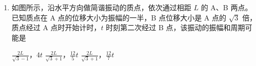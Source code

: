 \documentclass[\gkver]{gaokaozhenti}
\begin{document}
\begin{enumerate}
{体积增加了原来的 $\frac{1}{3}$，C 错误；

D．等容过程中气体做功为零，由热力学第一定律

$\Delta U = W + Q = 400 \UJ$

两个过程的初末温度相同即内能变化相同，因此内能增加都为 $400 \UJ$，D 正确；

AB．等压过程内能增加了 $400 \UJ$，吸收热量为 $600 \UJ$，由热力学第一定律可知气体对外做功为 $200 \UJ$，即做功的大小为

$W = p_{0}\left(\frac{4}{3}V_{0} - V_{0}\right) = 200 \UJ$

解得 $V_{0}=6 \UL$

A 正确 B 错误；

故选 AD。
}

\item
如图所示，沿水平方向做简谐振动的质点，依次通过相距 $L$ 的 A、B 两点。已知质点在 A 点的位移大小为振幅的一半，B 点位移大小是 A 点的 $\sqrt{3}$ 倍，质点经过 A 点时开始计时，$t$ 时刻第二次经过 B 点，该振动的振幅和周期可能是


{$\frac{2L}{\sqrt{3}-1}$，$4t$}
{$\frac{2L}{\sqrt{3}+1}$，$\frac{12}{5}t$}
{$\frac{2L}{\sqrt{3}+1}$，$\frac{12}{7}t$}

\end{enumerate}
\end{document}
